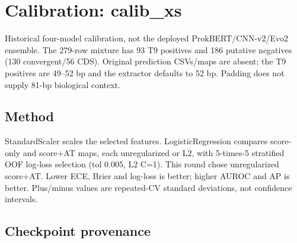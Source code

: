 \documentclass[10pt]{article}
\begin{document}
\section{Calibration: calib\_xs}\label{calibration-calib_xs}

Historical four-model calibration, not the deployed ProkBERT/CNN-v2/Evo2 ensemble. The 279-row mixture has 93 T9 positives and 186 putative negatives (130 convergent/56 CDS). Original prediction CSVs/maps are absent; the T9 positives are 49--52 bp and the extractor defaults to 52 bp. Padding does not supply 81-bp biological context.

\subsection{Method}\label{method}

StandardScaler scales the selected features. LogisticRegression compares score-only and score+AT maps, each unregularized or L2, with 5-times-5 stratified OOF log-loss selection (tol 0.005, L2 C=1). This round chose unregularized score+AT. Lower ECE, Brier and log-loss is better; higher AUROC and AP is better. Plus/minus values are repeated-CV standard deviations, not confidence intervals.

\subsection{Checkpoint provenance}\label{checkpoint-provenance}

{\def\LTcaptype{none} %
\begin{center}
\end{center}
}
\end{document}
